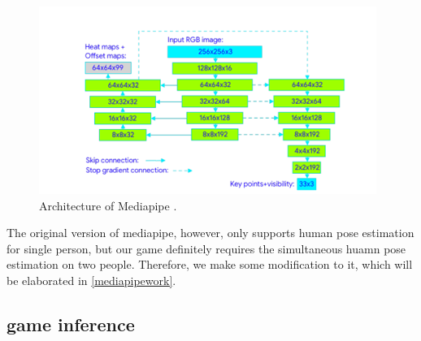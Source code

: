 \begin{figure}[ht]
    \centering
    \includegraphics[scale=.6]{fig/mp_arch.png}
    \caption{Architecture of Mediapipe \cite{lugaresi2019mediapipe}.}
    \label{fig:mp_arch}
\end{figure}

The original version of mediapipe, however, only supports human pose estimation for single person, but our game definitely requires the simultaneous huamn pose estimation on two people. Therefore, we make some modification to it, which will be elaborated in \ref{mediapipework}.

\subsection{game inference}